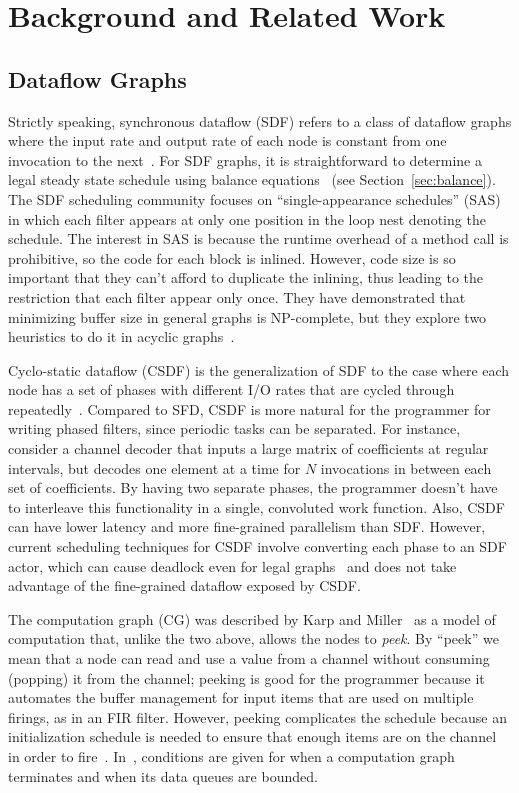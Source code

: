 \section{Background and Related Work}
\label{sec:related}

\subsection{Dataflow Graphs}

Strictly speaking, synchronous dataflow (SDF) refers to a class of
dataflow graphs where the input rate and output rate of each node is
constant from one invocation to the next~\cite{LM87-i,LM87-ii}.  For
SDF graphs, it is straightforward to determine a legal steady state
schedule using balance equations~\cite{leesdf} (see
Section~\ref{sec:balance}).  The SDF scheduling community focuses on
``single-appearance schedules'' (SAS) in which each filter appears at
only one position in the loop nest denoting the schedule.  The
interest in SAS is because the runtime overhead of a method call is
prohibitive, so the code for each block is inlined.  However, code
size is so important that they can't afford to duplicate the inlining,
thus leading to the restriction that each filter appear only once.
They have demonstrated that minimizing buffer size in general graphs
is NP-complete, but they explore two heuristics to do it in acyclic
graphs~\cite{Bhatta97}.

Cyclo-static dataflow (CSDF) is the generalization of SDF to the case
where each node has a set of phases with different I/O rates that are
cycled through repeatedly~\cite{BELP96,Parks95}.  Compared to SFD,
CSDF is more natural for the programmer for writing phased filters,
since periodic tasks can be separated.  For instance, consider a
channel decoder that inputs a large matrix of coefficients at regular
intervals, but decodes one element at a time for $N$ invocations in
between each set of coefficients.  By having two separate phases, the
programmer doesn't have to interleave this functionality in a single,
convoluted work function.  Also, CSDF can have lower latency and more
fine-grained parallelism than SDF.  However, current scheduling
techniques for CSDF involve converting each phase to an SDF actor,
which can cause deadlock even for legal graphs~\cite{BELP96} and does
not take advantage of the fine-grained dataflow exposed by CSDF.

The computation graph (CG) was described by Karp and
Miller~\cite{Karp67} as a model of computation that, unlike the two
above, allows the nodes to {\it peek}.  By ``peek'' we mean that a
node can read and use a value from a channel without consuming
(popping) it from the channel; peeking is good for the programmer
because it automates the buffer management for input items that are
used on multiple firings, as in an FIR filter.  However, peeking
complicates the schedule because an initialization schedule is needed
to ensure that enough items are on the channel in order to
fire~\cite{Gordo02}.  In~\cite{Karp67}, conditions are given for when
a computation graph terminates and when its data queues are bounded.

